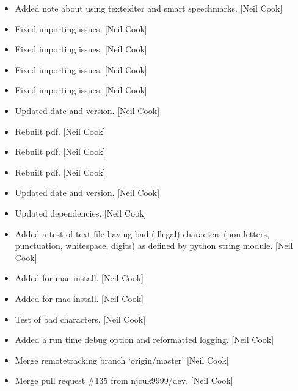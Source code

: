 \documentclass[a4paper,10pt,english]{report}
\begin{document}
\label{\detokenize{misc/changelog:id494}}\begin{itemize}
\item {} 
Added note about using texteidter and smart speechmarks. {[}Neil Cook{]}

\item {} 
Fixed importing issues. {[}Neil Cook{]}

\item {} 
Fixed importing issues. {[}Neil Cook{]}

\item {} 
Fixed importing issues. {[}Neil Cook{]}

\item {} 
Fixed importing issues. {[}Neil Cook{]}

\item {} 
Updated date and version. {[}Neil Cook{]}

\item {} 
Rebuilt pdf. {[}Neil Cook{]}

\item {} 
Rebuilt pdf. {[}Neil Cook{]}

\item {} 
Rebuilt pdf. {[}Neil Cook{]}

\item {} 
Updated date and version. {[}Neil Cook{]}

\item {} 
Updated dependencies. {[}Neil Cook{]}

\item {} 
Added a test of text file having bad (illegal) characters (non
letters, punctuation, whitespace, digits) as defined by python string
module. {[}Neil Cook{]}

\item {} 
Added  for mac install. {[}Neil Cook{]}

\item {} 
Added  for mac install. {[}Neil Cook{]}

\item {} 
Test of bad characters. {[}Neil Cook{]}

\item {} 
Added a run time debug option and reformatted logging. {[}Neil Cook{]}

\item {} 
Merge remote\sphinxhyphen{}tracking branch ‘origin/master’ {[}Neil Cook{]}

\item {} 
Merge pull request \#135 from njcuk9999/dev. {[}Neil Cook{]}


\end{itemize}
\end{document}
